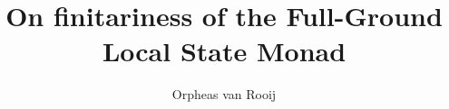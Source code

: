 \documentclass{article}
\theoremstyle{definition}
\theoremstyle{definition}
\theoremstyle{definition}
\theoremstyle{definition}
\theoremstyle{remark}
\theoremstyle{remark}
\theoremstyle{remark}
\theoremstyle{proof}
\begin{document}
\title{On finitariness of the Full-Ground Local State Monad}
\author{Orpheas van Rooij}

\maketitle







\printbibliography
\end{document}
